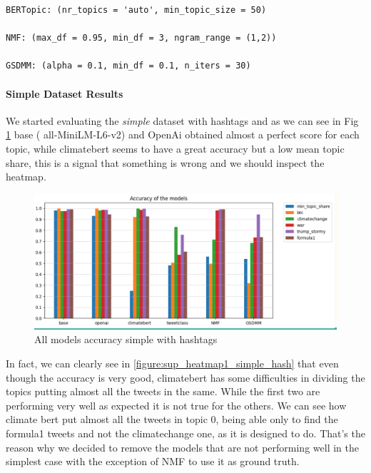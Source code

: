 \begin{verbatim}
BERTopic: (nr_topics = 'auto', min_topic_size = 50)

NMF: (max_df = 0.95, min_df = 3, ngram_range = (1,2))

GSDMM: (alpha = 0.1, min_df = 0.1, n_iters = 30)
\end{verbatim}


\paragraph{Simple Dataset Results}
We started evaluating the \textit{simple} dataset with hashtags and as we can see in Fig \ref{figure:supervised bar} base ( all-MiniLM-L6-v2) and OpenAi obtained almost a perfect score for each topic, while climatebert seems to have a great accuracy but a low mean topic share, this is a signal that something is wrong and we should inspect the heatmap.

\begin{figure}[h]
    \centering %
        \includegraphics[width=0.99\linewidth]{Chapter4/figures/topic_supervised_bar.png} 
    \caption{All models accuracy simple  with hashtags
    }
    \label{figure:supervised bar} %
\end{figure}

In fact, we can clearly see in \ref{figure:sup_heatmap1_simple_hash} that even though the accuracy is very good, climatebert has some difficulties in dividing the topics putting almost all the tweets in the same. While the first two are performing very well as expected it is not true for the others. We can see how climate bert put almost all the tweets in topic 0, being able only to find the formula1 tweets and not the climatechange one, as it is designed to do.
That’s the reason why we decided to remove the models that are not performing well in the simplest case with the exception of NMF to use it as ground truth. 


